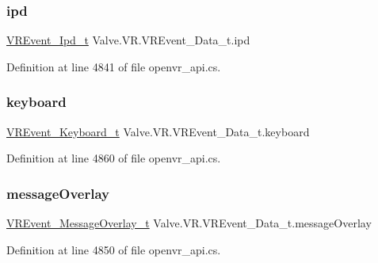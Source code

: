 \subsubsection{\texorpdfstring{ipd}{ipd}}
{\footnotesize\ttfamily \mbox{\hyperlink{struct_valve_1_1_v_r_1_1_v_r_event___ipd__t}{V\+R\+Event\+\_\+\+Ipd\+\_\+t}} Valve.\+V\+R.\+V\+R\+Event\+\_\+\+Data\+\_\+t.\+ipd}



Definition at line 4841 of file openvr\+\_\+api.\+cs.

\mbox{\label{struct_valve_1_1_v_r_1_1_v_r_event___data__t_a866cb4c7fe504f17e4d01c38547a449e}} 
\subsubsection{\texorpdfstring{keyboard}{keyboard}}
{\footnotesize\ttfamily \mbox{\hyperlink{struct_valve_1_1_v_r_1_1_v_r_event___keyboard__t}{V\+R\+Event\+\_\+\+Keyboard\+\_\+t}} Valve.\+V\+R.\+V\+R\+Event\+\_\+\+Data\+\_\+t.\+keyboard}



Definition at line 4860 of file openvr\+\_\+api.\+cs.

\mbox{\label{struct_valve_1_1_v_r_1_1_v_r_event___data__t_aedd176a4bba58548a2dd487ad6661923}} 
\subsubsection{\texorpdfstring{messageOverlay}{messageOverlay}}
{\footnotesize\ttfamily \mbox{\hyperlink{struct_valve_1_1_v_r_1_1_v_r_event___message_overlay__t}{V\+R\+Event\+\_\+\+Message\+Overlay\+\_\+t}} Valve.\+V\+R.\+V\+R\+Event\+\_\+\+Data\+\_\+t.\+message\+Overlay}



Definition at line 4850 of file openvr\+\_\+api.\+cs.

\mbox{\label{struct_valve_1_1_v_r_1_1_v_r_event___data__t_ae41f91a56f91c5f4de3a79a8b264bff1}} 
